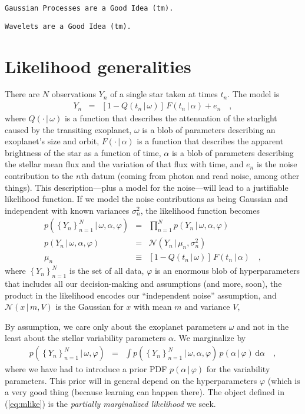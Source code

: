 \documentclass[12pt,letterpaper]{article}
\newcommand{\warning}[1]{\texttt{#1}}
\newcommand{\dd}{\mathrm{d}}
\newcommand{\given}{\,|\,}
\newcommand{\setof}[1]{\left\{{#1}\right\}}
\newcommand{\datum}{Y}
\newcommand{\data}{\setof{\datum_n}_{n=1}^N}
\renewcommand{\time}{t}
\newcommand{\exofn}{Q}
\newcommand{\exopars}{\omega}
\newcommand{\flux}{F}
\newcommand{\lcpars}{\alpha}
\newcommand{\noise}{e}
\newcommand{\variance}{\sigma^2}
\newcommand{\hyperpars}{\varphi}
\newcommand{\normal}{{\mathcal N}}
\newcommand{\mean}{\mu}
\begin{document}
\warning{Gaussian Processes are a Good Idea~(tm).}

\warning{Wavelets are a Good Idea~(tm).}

\section{Likelihood generalities}

There are $N$ observations $\datum_n$ of a single star taken at times $\time_n$.
The model is
\begin{eqnarray}
\datum_n &=& [1 - \exofn(t_n\given\exopars)]\,\flux(t_n\given\lcpars) + \noise_n
\quad ,
\end{eqnarray}
where
$\exofn(\cdot\given\exopars)$ is a function
that describes the attenuation of the starlight caused by the transiting exoplanet,
$\exopars$ is a blob of parameters describing an exoplanet's size and orbit,
$\flux(\cdot\given\lcpars)$ is a function
that describes the apparent brightness of the star as a function of time,
$\lcpars$ is a blob of parameters describing the stellar mean flux and the
variation of that flux with time,
and $\noise_n$ is the noise contribution to the $n$th datum
(coming from photon and read noise, among other things).
This description---plus a model for the noise---will lead to a justifiable likelihood function.
If we model the noise contributions as being Gaussian and independent
with known variances $\variance_n$, the likelihood function becomes
\begin{eqnarray}
p(\data\given\exopars,\lcpars,\hyperpars)
  &=& \prod_{n=1}^N p(\datum_n\given\exopars,\lcpars,\hyperpars)
\label{eq:like}
\\
p(\datum_n\given\exopars,\lcpars,\hyperpars)
  &=& \normal(\datum_n\given\mean_n,\variance_n)
\\
\mean_n
  &\equiv& [1 - \exofn(t_n\given\exopars)]\,\flux(t_n\given\lcpars)
\quad ,
\end{eqnarray}
where
$\data$ is the set of all data,
$\hyperpars$ is an enormous blob of hyperparameters
that includes all our decision-making and assumptions (and more, soon),
the product in the likelihood encodes our ``independent noise'' assumption,
and $\normal(x\given m,V)$ is the Gaussian for $x$ with mean $m$ and variance $V$,

By assumption, we care only about the exoplanet parameters $\exopars$
and not in the least about the stellar variability parameters $\lcpars$.
We marginalize by
\begin{eqnarray}
p(\data\given\exopars,\hyperpars)
  &=& \int p(\data\given\exopars,\lcpars,\hyperpars)\,p(\lcpars\given\hyperpars)\,\dd\lcpars
\label{eq:mlike}
\quad ,
\end{eqnarray}
where
we have had to introduce a prior PDF $p(\lcpars\given\hyperpars)$ for the variability parameters.
This prior will in general depend on the hyperparameters $\hyperpars$
(which is a very good thing (because learning can happen there).
The object defined in (\ref{eq:mlike}) is the \emph{partially marginalized likelihood}
we seek.
\end{document}
